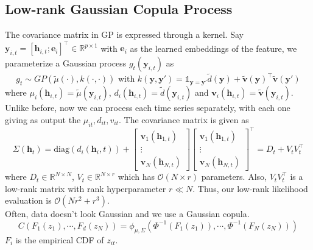 \subsection{Low-rank Gaussian Copula Process}
The covariance matrix in GP is expressed through a kernel. Say $\mathbf{y}_{i,t} = [\mathbf h_{i,t};\mathbf{e}_i]^\top \in \mathbb{R}^{p\times1}$ with $\mathbf e_i$ as the learned embeddings of the feature, we parameterize a Gaussian process $g_t(\mathbf y_{i,t})$ as
\begin{equation}
	g_t \sim GP(\widetilde{\mu}(\cdot), k(\cdot, \cdot)) \text{ with } k(\mathbf y, \mathbf y') = \mathbb{1}_{\mathbf y = \mathbf y'} \widetilde{d}(\mathbf y) + \widetilde{\mathbf{v}}(\mathbf y)^\top \widetilde{\mathbf{v}}(\mathbf y')
\end{equation}
where $\mu_i(\mathbf h_{i,t}) = \widetilde{\mu}(\mathbf y_{i,t})$, $d_i(\mathbf h_{i,t}) = \widetilde{d}(\mathbf y_{i,t})$ and $\mathbf{v}_i(\mathbf h_{i,t}) = \widetilde{\mathbf v}(\mathbf y_{i,t})$. Unlike before, now we can process each time series separately, with each one giving as output the $\mu_{it}, d_{it}, v_{it}$. The covariance matrix is given as
\begin{equation}
	\Sigma(\mathbf h_t) = \text{diag}(d_i(\mathbf h_i,t))+ \begin{bmatrix}
		\mathbf v_1(\mathbf h_{1,t}) \\ \vdots \\ \mathbf v_{N}(\mathbf h_{N,t})
	\end{bmatrix}
\begin{bmatrix}
	\mathbf v_1(\mathbf h_{1,t}) \\ \vdots \\ \mathbf v_{N}(\mathbf h_{N,t})
\end{bmatrix}^\top = D_t + V_tV_t^\top
\end{equation}
where $D_t \in \mathbb{R}^{N\times N}$, $V_t \in \mathbb{R}^{N \times r}$ which has $\mathcal{O}(N\times r)$ parameters. Also, $V_tV_t^\top$ is a low-rank matrix with rank hyperparameter $r \ll N$. Thus, our low-rank likelihood evaluation is $\mathcal{O}(Nr^2 + r^3)$. \\
Often, data doesn't look Gaussian and we use a Gaussian copula.
\begin{equation}
	C(F_1(z_1), \cdots, F_d(z_N)) = \phi_{\mu, \Sigma}(\Phi^{-1}(F_1(z_1)), \cdots, \Phi^{-1}(F_N(z_N)) )
\end{equation}
$F_i$ is the empirical CDF of $z_{it}$.
